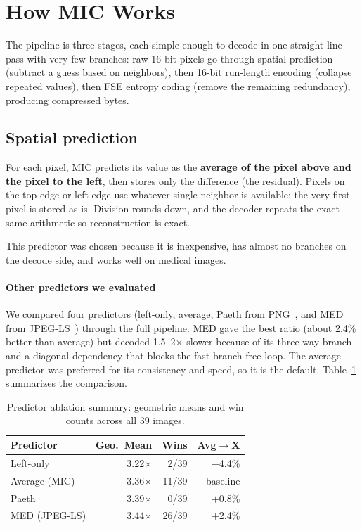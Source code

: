 \documentclass[journal]{IEEEtran}
\begin{document}
\section{How MIC Works}
\label{sec:pipeline}

The pipeline is three stages, each simple enough to decode in one
straight-line pass with very few branches: raw 16-bit pixels go through
spatial prediction (subtract a guess based on neighbors), then 16-bit
run-length encoding (collapse repeated values), then FSE entropy coding
(remove the remaining redundancy), producing compressed bytes.

\subsection{Spatial prediction}

For each pixel, MIC predicts its value as the \textbf{average of the pixel
above and the pixel to the left}, then stores only the difference (the
residual). Pixels on the top edge or left edge use whatever single neighbor is
available; the very first pixel is stored as-is. Division rounds down, and
the decoder repeats the exact same arithmetic so reconstruction is exact.

This predictor was chosen because it is inexpensive, has almost no branches on
the decode side, and works well on medical images.

\paragraph{Other predictors we evaluated} We compared four predictors
(left-only, average, Paeth from PNG~\cite{png}, and MED from JPEG-LS~\cite{loco1})
through the full pipeline. MED gave the best ratio (about 2.4\% better than
average) but decoded 1.5--2$\times$ slower because of its three-way branch and a
diagonal dependency that blocks the fast branch-free loop. The average
predictor was preferred for its consistency and speed, so it is the default.
Table~\ref{tab:predictor-summary} summarizes the comparison.

\begin{table}[htbp]
\centering
\caption{Predictor ablation summary: geometric means and win counts across all
39 images.}
\label{tab:predictor-summary}
\begin{tabular}{lrrr}
\toprule
Predictor & Geo.\ Mean & Wins & Avg$\to$X \\
\midrule
Left-only & 3.22$\times$ & 2/39 & $-$4.4\% \\
Average (MIC) & 3.36$\times$ & 11/39 & baseline \\
Paeth & 3.39$\times$ & 0/39 & $+$0.8\% \\
MED (JPEG-LS) & 3.44$\times$ & 26/39 & $+$2.4\% \\
\bottomrule
\end{tabular}
\end{table}
\end{document}
